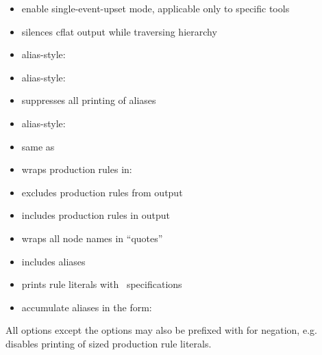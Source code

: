 \begin{itemize}
\item {} enable single-event-upset mode, 
	applicable only to specific tools
\item {} silences cflat output while traversing hierarchy
\item {} alias-style: 
\item {} alias-style: 
\item {} suppresses all printing of aliases
\item {} alias-style: 
\item {} same as 
\item {} wraps production rules in: 
\item {} excludes production rules from output
\item {} includes production rules in output
\item {} wraps all node names in ``quotes''
\item {} includes aliases 
\item {} prints rule literals with 
	\labracket{}\rabracket\ specifications
\item {} accumulate aliases in the form: 
\end{itemize}

All options except the  options may also be 
prefixed with  for negation, e.g.  disables
printing of sized production rule literals.  

